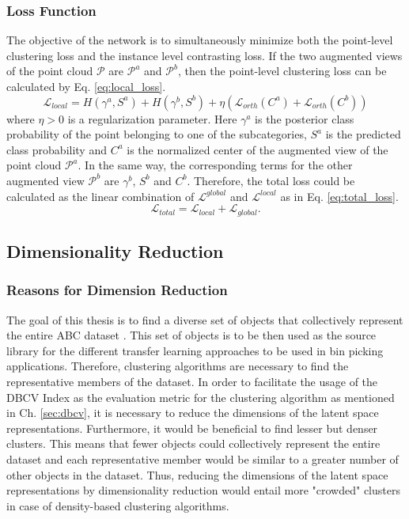\subsubsection{Loss Function}
The objective of the network is to simultaneously minimize both the point-level clustering loss and the instance level contrasting loss. If the two augmented views of the point cloud $\mathcal{P}$ are $\mathcal{P}^a$ and $\mathcal{P}^b$, then the point-level clustering loss can be calculated by Eq. \ref{eq:local_loss}.
\begin{equation}
    \label{eq:local_loss}
    \mathcal{L}_{\mathit{local}} = H(\gamma^{a}, S^a) + H(\gamma^{b}, S^b) + \eta(\mathcal{L}_{orth}(C^a) + \mathcal{L}_{orth}(C^b))
\end{equation}
where $\eta>0$ is a regularization parameter. Here $\gamma^a$ is the posterior class probability of the point belonging to one of the subcategories, $S^a$ is the predicted class probability and $C^a$ is the normalized center of the augmented view of the point cloud $\mathcal{P}^a$. In the same way, the corresponding terms for the other augmented view $\mathcal{P}^b$ are $\gamma^b$, $S^b$ and $C^b$. Therefore, the total loss could be calculated as the linear combination of $\mathcal{L}^{global}$ and $\mathcal{L}^{local}$ as in Eq. \ref{eq:total_loss}.
\begin{equation}
    \label{eq:total_loss}
    \mathcal{L}_{\mathit{total}} = \mathcal{L}_{\mathit{local}} + \mathcal{L}_{\mathit{global}}.
\end{equation}

\subsection{Dimensionality Reduction}
\subsubsection{Reasons for Dimension Reduction}
The goal of this thesis is to find a diverse set of objects that collectively represent the entire ABC dataset \cite{Koch_2019_CVPR}. This set of objects is to be then used as the source library for the different transfer learning approaches to be used in bin picking applications. Therefore, clustering algorithms are necessary to find the representative members of the dataset. In order to facilitate the usage of the \ac{DBCV} Index as the evaluation metric for the clustering algorithm as mentioned in Ch. \ref{sec:dbcv}, it is necessary to reduce the dimensions of the latent space representations. Furthermore, it would be beneficial to find lesser but denser clusters. This means that fewer objects could collectively represent the entire dataset and each representative member would be similar to a greater number of other objects in the dataset. Thus, reducing the dimensions of the latent space representations by dimensionality reduction would entail more "crowded" clusters in case of density-based clustering algorithms.

